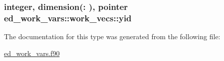 \subsubsection[{yid}]{\setlength{\rightskip}{0pt plus 5cm}integer, dimension(\+:  ), pointer ed\+\_\+work\+\_\+vars\+::work\+\_\+vecs\+::yid}\label{structed__work__vars_1_1work__vecs_a456fdc2f1a35f3a46bab6d6affac952e}


The documentation for this type was generated from the following file\+:\begin{DoxyCompactItemize}
\item 
\hyperlink{ed__work__vars_8f90}{ed\+\_\+work\+\_\+vars.\+f90}\end{DoxyCompactItemize}
